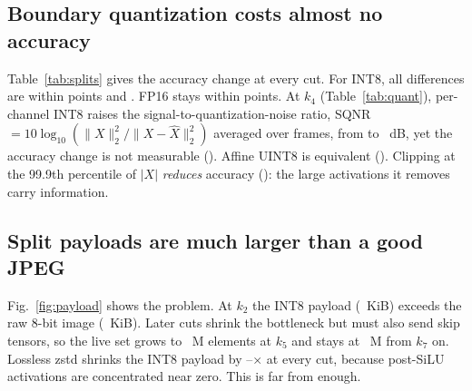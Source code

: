 \documentclass[journal,twocolumn,10pt]{IEEEtran}
\newcommand{\figref}[1]{Fig.~\ref{#1}}
\begin{document}
\subsection{Boundary quantization costs almost no accuracy}\label{sec:accuracy}
Table~\ref{tab:splits} gives the accuracy change at every cut. For INT8, all differences are within \MaxAbsDeltaINT{} points and \SignificanceSentence. FP16 stays within \MaxAbsDeltaFPsixteen{} points. At $k_4$ (Table~\ref{tab:quant}), per-channel INT8 raises the signal-to-quantization-noise ratio, SQNR $=10\log_{10}(\|X\|_2^2/\|X-\hat X\|_2^2)$ averaged over frames, from \SQNRINT{} to \SQNRPerChannel{}~dB, yet the accuracy change is not measurable (\DeltaPerChannel). Affine UINT8 is equivalent (\DeltaUINT). Clipping at the 99.9th percentile of $|X|$ \emph{reduces} accuracy (\DeltaClip): the large activations it removes carry information.

\begin{table}[t]
\centering
\caption{Cuts of YOLOv8s: tensors sent, onboard compute, measured payload, and accuracy change on COCO val2017 (mAP@[.5:.95] points; 95\% paired-bootstrap CI).}
\label{tab:splits}

\end{table}

\begin{table}[t]
\centering
\caption{Wire precision at $k_4$ (real activations of \TimingImages{} frames; accuracy on \NumValImages{} images).}
\label{tab:quant}
{\scriptsize\setlength{\tabcolsep}{4pt}}
\end{table}

\subsection{Split payloads are much larger than a good JPEG}\label{sec:rate}
\figref{fig:payload} shows the problem. At $k_2$ the INT8 payload (\PayloadINTKTwo~KiB) exceeds the raw 8-bit image (\RawImageKiB~KiB). Later cuts shrink the bottleneck but must also send skip tensors, so the live set grows to \LiveElemsKFiveM~M elements at $k_5$ and stays at \LiveElemsKSevenM~M from $k_7$ on. Lossless zstd shrinks the INT8 payload by \ZstdRatioMin--\ZstdRatioMax$\times$ at every cut, because post-SiLU activations are concentrated near zero. This is far from enough.
\end{document}
